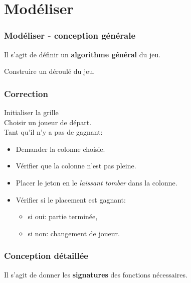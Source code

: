 \documentclass[svgnames,11pt]{beamer}
\begin{document}
\section{Modéliser}
\begin{frame}
    \frametitle{Modéliser - conception générale}

    \begin{aretenir}[]
        Il s'agit de définir un \textbf{algorithme général} du jeu.
    \end{aretenir}
    \begin{activite}
        Construire un déroulé du jeu.
    \end{activite}
\end{frame}
\begin{frame}
    \frametitle{Correction}
    Initialiser la grille\\
    Choisir un joueur de départ.\\
    Tant qu'il n'y a pas de gagnant:
    \begin{itemize}
        \item Demander la colonne choisie.
        \item Vérifier que la colonne n'est pas pleine.
        \item Placer le jeton en le \emph{laissant tomber} dans la colonne.
        \item Vérifier si le placement est gagnant:
              \begin{itemize}
                  \item si oui: partie terminée,
                  \item si non: changement de joueur.
              \end{itemize}
    \end{itemize}

\end{frame}
\begin{frame}
    \frametitle{Conception détaillée}

    \begin{aretenir}[]
        Il s'agit de donner les \textbf{signatures} des fonctions nécessaires.
    \end{aretenir}

\end{frame}
\end{document}
